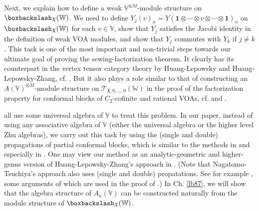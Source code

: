 \documentclass[11pt,b5paper,notitlepage]{article}
\theoremstyle{definition}
\theoremstyle{plain}
\newcommand{\id}{\mathbf{1}}
\newcommand{\scr}{\mathscr}
\newcommand{\Vbb}{\mathbb V}
\newcommand{\Wbb}{\mathbb W}
\newcommand{\<}{\left\langle}
\renewcommand{\>}{\right\rangle}
\newcommand{\fx}{\mathfrak{X}}
\newcommand{\bbs}{\boxbackslash}
\numberwithin{equation}{subsection}
\begin{document}
Next, we explain how to define a weak $\Vbb^{\otimes M}$-module structure on $\bbs_\fx(\Wbb)$. We need to define $Y_j(v)_n=Y(\id\otimes\cdots\otimes v\otimes\cdots\otimes\id)_n$ on $\bbs_{\fx}(\Wbb)$ for each $v\in \Vbb$, show that $Y_j$ satisfies the Jacobi identity in the definition of weak VOA modules, and show that $Y_j$ commutes with $Y_k$ if $j\neq k$. This task is one of the most important and non-trivial steps towards our ultimate goal of proving the sewing-factorization theorem. It clearly has its counterpart in the vertex tensor category theory by Huang-Lepowsky and Huang-Lepowsky-Zhang, cf. \cite[Ch. 6]{HLZ4}. But it also plays a role similar to that of constructing an $A(\Vbb)^{\otimes M}$-module structure on $\scr T_{\fx,0,\dots,0}(\Wbb)$ in the proof of the factorization property for conformal blocks of $C_2$-cofinite and rational VOAs, cf. \cite[Sec. 7.2]{NT-P1_conformal_blocks} and \cite[Sec. 6]{DGT2}. 

\cite{NT-P1_conformal_blocks,DGT2,KZ-conformal-block} all use some universal algebra of $\Vbb$ to treat this problem. In our paper, instead of using any associative algebra of $\Vbb$ (either the universal algebra or the higher level Zhu algebras), we carry out this task by using the (single and double) propagations of partial conformal blocks, which is similar to the methods in \cite{Zhu-global} and especially in \cite{Gui-propagation}. One may view our method as an analytic-geometric and higher-genus version of Huang-Lepowsky-Zhang's approach in \cite{HLZ4}. (Note that Nagatomo-Tsuchiya's approach also uses (single and double) propatations. See for example  \cite[Sec. 5.5]{NT-P1_conformal_blocks}, some arguments of which are used in the proof of \cite[Prop. 7.7.2.]{NT-P1_conformal_blocks}.) In Ch. \ref{lb87}, we will show that the algebra structure of $A_n(\Vbb)$ can be constructed naturally from the module structure of $\bbs_\fx(\Wbb)$.
\end{document}
